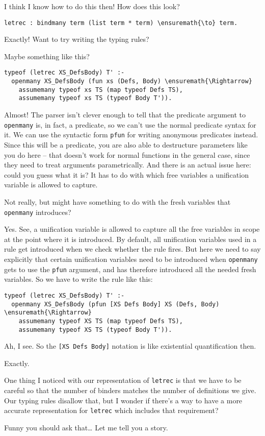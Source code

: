 \heroSTUDENT{} I think I know how to do this then! How does this look?

\begin{verbatim}
letrec : bindmany term (list term * term) \ensuremath{\to} term.
\end{verbatim}

\heroADVISOR{} Exactly! Want to try writing the typing rules?

\heroSTUDENT{} Maybe something like this?

\begin{verbatim}
typeof (letrec XS_DefsBody) T' :-
  openmany XS_DefsBody (fun xs (Defs, Body) \ensuremath{\Rightarrow}
    assumemany typeof xs TS (map typeof Defs TS),
    assumemany typeof xs TS (typeof Body T')).
\end{verbatim}

\heroADVISOR{} Almost! The parser isn't clever enough to tell that the
predicate argument to \texttt{openmany} is, in fact, a predicate, so we
can't use the normal predicate syntax for it. We can use the syntactic
form \texttt{pfun} for writing anonymous predicates instead. Since this
will be a predicate, you are also able to destructure parameters like
you do here -- that doesn't work for normal functions in the general
case, since they need to treat arguments parametrically. And there is an
actual issue here: could you guess what it is? It has to do with which
free variables a unification variable is allowed to capture.

\heroSTUDENT{} Not really, but might have something to do with the fresh
variables that \texttt{openmany} introduces?

\heroADVISOR{} Yes. See, a unification variable is allowed to capture all the
free variables in scope at the point where it is introduced. By default,
all unification variables used in a rule get introduced when we check
whether the rule fires. But here we need to say explicitly that certain
unification variables need to be introduced when \texttt{openmany} gets
to use the \texttt{pfun} argument, and has therefore introduced all the
needed fresh variables. So we have to write the rule like this:

\begin{verbatim}
typeof (letrec XS_DefsBody) T' :-
  openmany XS_DefsBody (pfun [XS Defs Body] XS (Defs, Body) \ensuremath{\Rightarrow}
    assumemany typeof XS TS (map typeof Defs TS),
    assumemany typeof XS TS (typeof Body T')).
\end{verbatim}

\heroSTUDENT{} Ah, I see. So the \texttt{{[}XS\ Defs\ Body{]}} notation is
like existential quantification then.

\heroADVISOR{} Exactly.

\heroSTUDENT{} One thing I noticed with our representation of \texttt{letrec}
is that we have to be careful so that the number of binders matches the
number of definitions we give. Our typing rules disallow that, but I
wonder if there's a way to have a more accurate representation for
\texttt{letrec} which includes that requirement?

\heroADVISOR{} Funny you should ask that\ldots{} Let me tell you a story.
